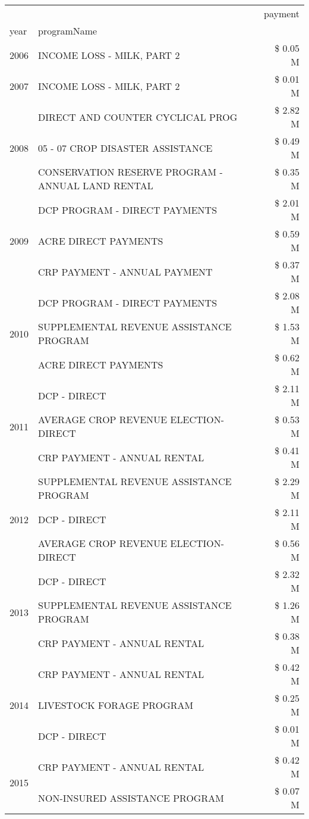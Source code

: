 \begin{tabular}{llr}
\toprule
 &  & payment \\
year & programName &  \\
\midrule
2006 & INCOME LOSS - MILK, PART 2 & \$ 0.05 M \\
\cline{1-3}
2007 & INCOME LOSS - MILK, PART 2 & \$ 0.01 M \\
\cline{1-3}
\multirow[t]{3}{*}{2008} & DIRECT AND COUNTER CYCLICAL PROG & \$ 2.82 M \\
 & 05 - 07 CROP DISASTER ASSISTANCE & \$ 0.49 M \\
 & CONSERVATION RESERVE PROGRAM - ANNUAL LAND RENTAL & \$ 0.35 M \\
\cline{1-3}
\multirow[t]{3}{*}{2009} & DCP PROGRAM - DIRECT PAYMENTS & \$ 2.01 M \\
 & ACRE DIRECT PAYMENTS & \$ 0.59 M \\
 & CRP PAYMENT - ANNUAL PAYMENT & \$ 0.37 M \\
\cline{1-3}
\multirow[t]{3}{*}{2010} & DCP PROGRAM - DIRECT PAYMENTS & \$ 2.08 M \\
 & SUPPLEMENTAL REVENUE ASSISTANCE PROGRAM & \$ 1.53 M \\
 & ACRE DIRECT PAYMENTS & \$ 0.62 M \\
\cline{1-3}
\multirow[t]{3}{*}{2011} & DCP - DIRECT & \$ 2.11 M \\
 & AVERAGE CROP REVENUE ELECTION-DIRECT & \$ 0.53 M \\
 & CRP PAYMENT - ANNUAL RENTAL & \$ 0.41 M \\
\cline{1-3}
\multirow[t]{3}{*}{2012} & SUPPLEMENTAL REVENUE ASSISTANCE PROGRAM & \$ 2.29 M \\
 & DCP - DIRECT & \$ 2.11 M \\
 & AVERAGE CROP REVENUE ELECTION-DIRECT & \$ 0.56 M \\
\cline{1-3}
\multirow[t]{3}{*}{2013} & DCP - DIRECT & \$ 2.32 M \\
 & SUPPLEMENTAL REVENUE ASSISTANCE PROGRAM & \$ 1.26 M \\
 & CRP PAYMENT - ANNUAL RENTAL & \$ 0.38 M \\
\cline{1-3}
\multirow[t]{3}{*}{2014} & CRP PAYMENT - ANNUAL RENTAL & \$ 0.42 M \\
 & LIVESTOCK FORAGE PROGRAM & \$ 0.25 M \\
 & DCP - DIRECT & \$ 0.01 M \\
\cline{1-3}
\multirow[t]{3}{*}{2015} & CRP PAYMENT - ANNUAL RENTAL & \$ 0.42 M \\
 & NON-INSURED ASSISTANCE PROGRAM & \$ 0.07 M \\

\end{tabular}
